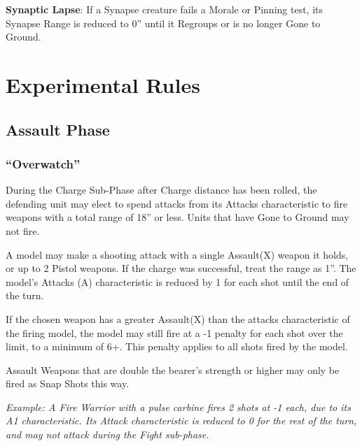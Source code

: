 \documentclass[letterpaper,twocolumn,oneside,titlepage]{book}
\begin{document}
\textbf{Synaptic Lapse}: If a Synapse creature fails a Morale or Pinning
test, its Synapse Range is reduced to 0'' until it Regroups or is no
longer Gone to Ground.

\chapter{\texorpdfstring{\textbf{Experimental
Rules}}{Experimental Rules}}\label{experimental-rules}

\section{\texorpdfstring{\textbf{Assault
Phase}}{Assault Phase}}\label{assault-phase-1}

\subsection{\texorpdfstring{\textbf{``Overwatch''}}{``Overwatch''}}\label{overwatch}

During the Charge Sub-Phase after Charge distance has been rolled, the
defending unit may elect to spend attacks from its Attacks
characteristic to fire weapons with a total range of 18'' or less. Units
that have Gone to Ground may not fire.

A model may make a shooting attack with a single Assault(X) weapon it
holds, or up to 2 Pistol weapons. If the charge was successful, treat
the range as 1''. The model's Attacks (A) characteristic is reduced by 1
for each shot until the end of the turn.

If the chosen weapon has a greater Assault(X) than the attacks
characteristic of the firing model, the model may still fire at a -1
penalty for each shot over the limit, to a minimum of 6+. This penalty
applies to all shots fired by the model.

Assault Weapons that are double the bearer's strength or higher may only
be fired as Snap Shots this way.

\emph{Example: A Fire Warrior with a pulse carbine fires 2 shots at -1
each, due to its A1 characteristic. Its Attack characteristic is reduced
to 0 for the rest of the turn, and may not attack during the Fight
sub-phase.}

\backmatter
\end{document}
